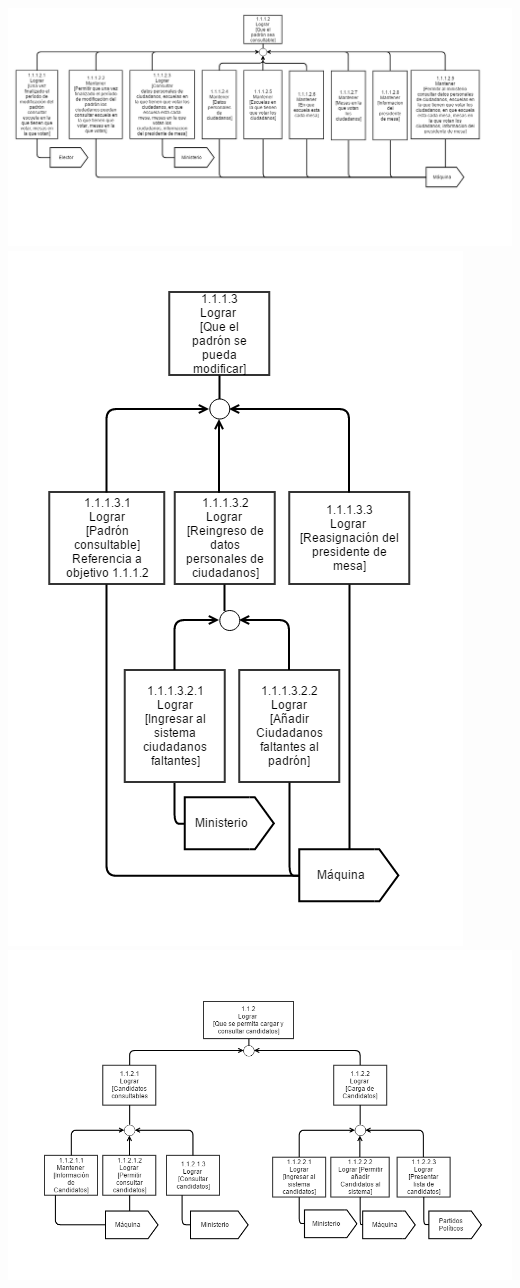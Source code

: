 \\
\includegraphics[scale=0.54]{imagenes/Diagramas/11/1112.png}
\\
\includegraphics[scale=0.55]{imagenes/Diagramas/11/1113.png}
\\
\includegraphics[scale=0.55]{imagenes/Diagramas/11/112.png}
